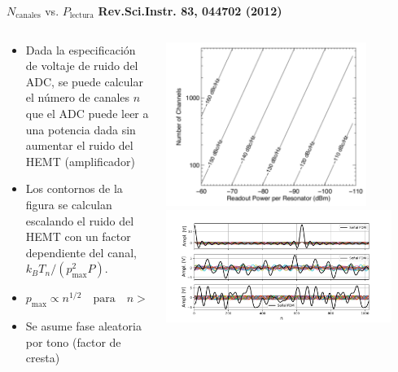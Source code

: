 \documentclass[ignorenonframetext,12pt]{beamer}
\begin{document}
\begin{frame}{$N_\text{canales}$ vs. $P_\text{lectura}$}
				\footnotesize{\textbf{Rev.Sci.Instr. 83, 044702 (2012)}}
				\begin{columns}
								\begin{column}{0.4\textwidth}
												\begin{itemize}
																\item \footnotesize{Dada la especificación de
																				voltaje de ruido del ADC, se puede
																				calcular el número de canales
																				{\color{red}$n$} que el ADC puede leer
																				a una potencia dada sin aumentar el
																				ruido del HEMT (amplificador)}
																\item Los contornos de la figura se calculan
																				escalando  el ruido del HEMT con un
																				factor dependiente del canal, $k_B
																				T_n /(p_\text{max}^2 P)$.
																\item $p_\text{max} \propto
																				n^{1/2}\quad\text{para}\quad n >> 1$
																\item {\color{blue}Se asume fase aleatoria por
																				tono (factor de cresta)}
												\end{itemize}
								\end{column}
								\begin{column}{0.6\textwidth}
												\centering
												\includegraphics[width=0.8\textwidth]{power_vs_Nchannels2}
												\includegraphics[width=0.9\textwidth]{in_spectrum_time2}

\end{column}
\end{columns}
\end{frame}
\end{document}
